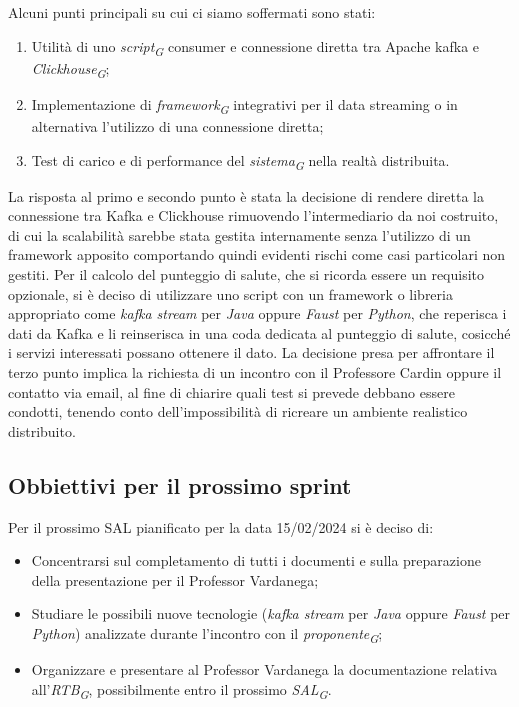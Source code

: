 \documentclass{article}
\begin{document}
    Alcuni punti principali su cui ci siamo soffermati sono stati:
    \begin{enumerate}
        \item Utilità di uno \textit{script}\textsubscript{\textit{G}} consumer e connessione diretta tra Apache kafka e \textit{Clickhouse}\textsubscript{\textit{G}};
        \item Implementazione di \textit{framework}\textsubscript{\textit{G}} integrativi per il data streaming o in alternativa l'utilizzo di una connessione diretta;
        \item Test di carico e di performance del \textit{sistema}\textsubscript{\textit{G}} nella realtà distribuita.
        \end{enumerate}
    
        La risposta al primo e secondo punto è stata la decisione di rendere diretta la connessione tra Kafka e Clickhouse rimuovendo l'intermediario da noi costruito, di cui la scalabilità sarebbe stata gestita internamente senza l'utilizzo di un framework apposito comportando quindi evidenti rischi come casi particolari non gestiti. Per il calcolo del punteggio di salute, che si ricorda essere un requisito opzionale, si è deciso di utilizzare uno script con un framework o libreria appropriato come \textit{kafka stream} per \textit{Java} oppure \textit{Faust} per \textit{Python}, che reperisca i dati da Kafka e li reinserisca in una coda dedicata al punteggio di salute, cosicché i servizi interessati possano ottenere il dato.
        La decisione presa per affrontare il terzo punto implica la richiesta di un incontro con il Professore Cardin oppure il contatto via email, al fine di chiarire quali test si prevede debbano essere condotti, tenendo conto dell'impossibilità di ricreare un ambiente realistico distribuito.
   
    \subsection{Obbiettivi per il prossimo sprint}
    
    Per il prossimo SAL pianificato per la data 15/02/2024 si è deciso di: 
    \begin{itemize}
        \item Concentrarsi sul completamento di tutti i documenti e sulla preparazione della presentazione per il Professor Vardanega;
        \item Studiare le possibili nuove tecnologie (\textit{kafka stream} per \textit{Java} oppure \textit{Faust} per \textit{Python}) analizzate durante l'incontro con il \textit{proponente}\textsubscript{\textit{G}}; 
        \item Organizzare e presentare al Professor Vardanega la documentazione relativa all'\textit{RTB}\textsubscript{\textit{G}}, possibilmente entro il prossimo \textit{SAL}\textsubscript{\textit{G}}.
    \end{itemize}
\end{document}
